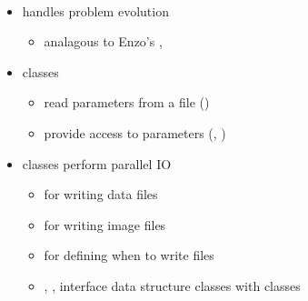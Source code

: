 \begin{frame}[fragile] 
\secframetitle{\ssComponents}
\framesubtitle{}

\begin{itemize}
\item {} handles problem evolution
\begin{itemize}
\item analagous to Enzo's , 
\end{itemize}

\item {} classes
\begin{itemize}
\item read parameters from a file () 
\item provide access to parameters (, )
\end{itemize}
\item {} classes perform parallel IO
\begin{itemize}
\item {} for writing data files
\item {} for writing image files
\item {} for defining when to write files
\item {}, , 
interface data structure classes with  classes
\end{itemize}
\end{itemize}
\end{frame}

